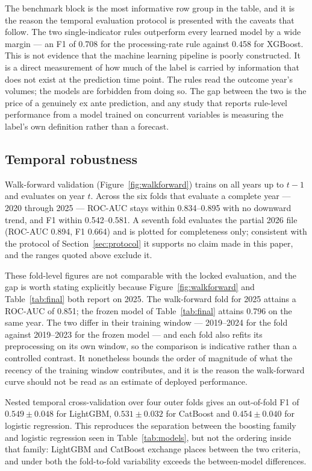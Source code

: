 \documentclass[sn-vancouver,Numbered]{sn-jnl}
\begin{document}
The benchmark block is the most informative row group in the table, and it is the reason the temporal evaluation protocol is presented with the caveats that follow. The two single-indicator rules outperform every learned model by a wide margin --- an F1 of 0.708 for the processing-rate rule against 0.458 for XGBoost. This is not evidence that the machine learning pipeline is poorly constructed. It is a direct measurement of how much of the label is carried by information that does not exist at the prediction time point. The rules read the outcome year's volumes; the models are forbidden from doing so. The gap between the two is the price of a genuinely ex ante prediction, and any study that reports rule-level performance from a model trained on concurrent variables is measuring the label's own definition rather than a forecast.

\subsection{Temporal robustness}

Walk-forward validation (Figure~\ref{fig:walkforward}) trains on all years up to $t-1$ and evaluates on year $t$. Across the six folds that evaluate a complete year --- 2020 through 2025 --- ROC-AUC stays within 0.834--0.895 with no downward trend, and F1 within 0.542--0.581. A seventh fold evaluates the partial 2026 file (ROC-AUC 0.894, F1 0.664) and is plotted for completeness only; consistent with the protocol of Section~\ref{sec:protocol} it supports no claim made in this paper, and the ranges quoted above exclude it.

These fold-level figures are not comparable with the locked evaluation, and the gap is worth stating explicitly because Figure~\ref{fig:walkforward} and Table~\ref{tab:final} both report on 2025. The walk-forward fold for 2025 attains a ROC-AUC of 0.851; the frozen model of Table~\ref{tab:final} attains 0.796 on the same year. The two differ in their training window --- 2019--2024 for the fold against 2019--2023 for the frozen model --- and each fold also refits its preprocessing on its own window, so the comparison is indicative rather than a controlled contrast. It nonetheless bounds the order of magnitude of what the recency of the training window contributes, and it is the reason the walk-forward curve should not be read as an estimate of deployed performance.

Nested temporal cross-validation over four outer folds gives an out-of-fold F1 of $0.549 \pm 0.048$ for LightGBM, $0.531 \pm 0.032$ for CatBoost and $0.454 \pm 0.040$ for logistic regression. This reproduces the separation between the boosting family and logistic regression seen in Table~\ref{tab:models}, but not the ordering inside that family: LightGBM and CatBoost exchange places between the two criteria, and under both the fold-to-fold variability exceeds the between-model differences.
\end{document}
